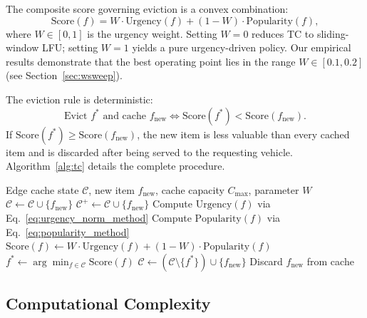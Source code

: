 \documentclass[preprint,12pt]{elsarticle}
\begin{document}
	The composite score governing eviction is a convex combination:
	\begin{equation}
		\text{Score}(f) = W \cdot \text{Urgency}(f) + (1 - W) \cdot \text{Popularity}(f),
		\label{eq:score_method}
	\end{equation}
	where $W \in [0, 1]$ is the urgency weight. Setting $W = 0$ reduces TC to sliding-window LFU; setting $W = 1$ yields a pure urgency-driven policy. Our empirical results demonstrate that the best operating point lies in the range $W \in [0.1, 0.2]$ (see Section~\ref{sec:wsweep}).
	
	The eviction rule is deterministic:
	\begin{equation}
		\text{Evict } f^* \text{ and cache } f_\text{new} \iff \text{Score}(f^*) < \text{Score}(f_\text{new}).
		\label{eq:evict_method}
	\end{equation}
	If $\text{Score}(f^*) \geq \text{Score}(f_\text{new})$, the new item is less valuable than every cached item and is discarded after being served to the requesting vehicle. Algorithm~\ref{alg:tc} details the complete procedure.
	
	\begin{algorithm}[t]
		\caption{TrajectoryCache Eviction Policy}
		\label{alg:tc}
		\begin{algorithmic}[1]
			\REQUIRE Edge cache state $\mathcal{C}$, new item $f_\text{new}$, cache capacity $C_\text{max}$, parameter $W$
			\STATE $\mathcal{C} \leftarrow \mathcal{C} \cup \{f_\text{new}\}$
			\RETURN
			\ENDIF
			\STATE $\mathcal{C}^+ \leftarrow \mathcal{C} \cup \{f_\text{new}\}$
			\STATE Compute $\text{Urgency}(f)$ via Eq.~\ref{eq:urgency_norm_method}
			\STATE Compute $\text{Popularity}(f)$ via Eq.~\ref{eq:popularity_method}
			\STATE $\text{Score}(f) \leftarrow W \cdot \text{Urgency}(f) + (1 - W) \cdot \text{Popularity}(f)$
			\ENDFOR
			\STATE $f^* \leftarrow \arg\min_{f \in \mathcal{C}} \text{Score}(f)$
			\STATE $\mathcal{C} \leftarrow (\mathcal{C} \setminus \{f^*\}) \cup \{f_\text{new}\}$
			\ELSE
			\STATE Discard $f_\text{new}$ from cache
			\ENDIF
		\end{algorithmic}
	\end{algorithm}
	
	\subsection{Computational Complexity}
	
\end{document}

